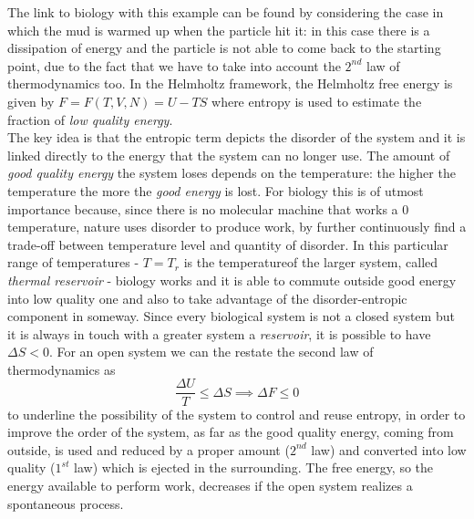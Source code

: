 \documentclass[../main/main.tex]{subfiles}
\begin{document}
The link to biology with this example can be found by considering the case in which the mud is warmed up when the particle hit it: in this case there is a dissipation of energy and the particle is not able to come back to the starting point, due to the fact that we have to take into account the $2^{nd}$ law of thermodynamics too. In the Helmholtz framework, the Helmholtz free energy is given by $F=F(T, V, N) = U-TS$ where entropy is used to estimate the fraction of \emph{low quality energy}. \\
The key idea is that the entropic term depicts the disorder of the system and it is linked directly to the energy that the system can no longer use. The amount of \emph{good quality energy} the system loses depends on the temperature: the higher the temperature the more the \emph{good energy} is lost.
For biology this is of utmost importance because, since there is no molecular machine that works a $0$ temperature, nature uses disorder to produce work, by further continuously find a trade-off between temperature level and quantity of disorder. In this particular range of temperatures - $T=T_r$ is the temperatureof the larger system, called \emph{thermal reservoir} - biology works and it is able to commute outside good energy into low quality one and also to take advantage of the disorder-entropic component in someway.
Since every biological system is not a closed system but it is always in touch with a greater system a \emph{reservoir}, it is possible to have $\Delta S <0$. 
For an open system we can the restate the second law of thermodynamics as 
\begin{equation}
    \frac{\Delta U}{T} \leq \Delta S \implies \Delta F \leq 0
\end{equation}    
to underline the possibility of the system to control and reuse entropy, in order to improve the order of the system, as far as the good quality energy, coming from outside, is used and reduced by a proper amount ($2^{nd}$ law) and converted into low quality ($1^{st}$ law) which is ejected in the surrounding. The free energy, so the energy available to perform work, decreases if the open system realizes a spontaneous process.
\end{document}
